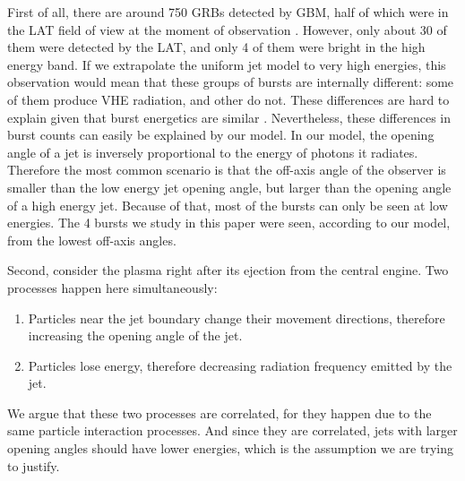\documentclass[11pt,a4paper]{article}
\begin{document}
First of all, there are around 750 GRBs detected by GBM, half of which were in the LAT field of view at the moment of observation \cite{Vianello:2013ela}.
However, only about 30 of them were detected by the LAT, and only 4 of them were bright in the high energy band.
If we extrapolate the uniform jet model to very high energies, this observation would mean that these groups of bursts are internally different: some of them produce VHE radiation, and other do not.
These differences are hard to explain given that burst energetics are similar \cite{Bloom:2003wy}.
Nevertheless, these differences in burst counts can easily be explained by our model.
In our model, the opening angle of a jet is inversely proportional to the energy of photons it radiates.
Therefore the most common scenario is that the off-axis angle of the observer is smaller than the low energy jet opening angle, but larger than the opening angle of a high energy jet.
Because of that, most of the bursts can only be seen at low energies.
The 4 bursts we study in this paper were seen, according to our model, from the lowest off-axis angles.

Second, consider the plasma right after its ejection from the central engine.
Two processes happen here simultaneously:
\begin{enumerate}
	\item{Particles near the jet boundary change their movement directions, therefore increasing the opening angle of the jet.}
	\item{Particles lose energy, therefore decreasing radiation frequency emitted by the jet.}
\end{enumerate}
We argue that these two processes are correlated, for they happen due to the same particle interaction processes.
And since they are correlated, jets with larger opening angles should have lower energies, which is the assumption we are trying to justify.
\end{document}
